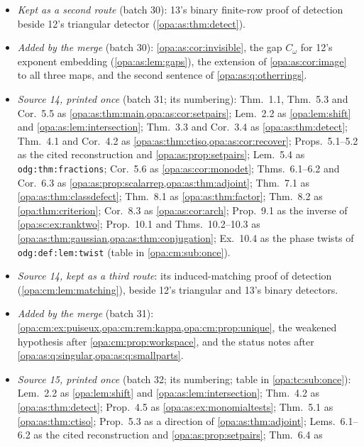 \documentclass[11pt,oneside]{article}
\numberwithin{equation}{section}
\theoremstyle{definition}
\theoremstyle{remark}
\newcommand{\lbl}[1]{\nolinkurl{#1}}
\begin{document}
\begin{itemize}[itemsep=2pt]
\lbl{saut:thm:coeffflow}; its constants and automorphism rigidity (11 prop.~8.1, cor.~8.2) are
\lbl{odg:def:thm:multiplier}, \lbl{odg:def:cor:internal} and \cref{opa:cor:allautos}.
\item \emph{Kept as a second route} (batch 30): 13's binary finite-row proof of detection beside
12's triangular detector (\cref{opa:as:thm:detect}).
\item \emph{Added by the merge} (batch 30): \cref{opa:as:cor:invisible}, the gap $C_\omega$ for
12's exponent embedding (\cref{opa:as:lem:gaps}), the extension of \cref{opa:as:cor:image} to all
three maps, and the second sentence of \cref{opa:as:q:otherrings}.
\item \emph{Source 14, printed once} (batch 31; its numbering): Thm.~1.1, Thm.~5.3 and Cor.~5.5 as
\cref{opa:as:thm:main,opa:as:cor:setpairs}; Lem.~2.2 as \cref{opa:lem:shift} and
\cref{opa:as:lem:intersection}; Thm.~3.3 and Cor.~3.4 as \cref{opa:as:thm:detect}; Thm.~4.1 and
Cor.~4.2 as \cref{opa:as:thm:ctiso,opa:as:cor:recover}; Props.~5.1--5.2 as the cited
reconstruction and \cref{opa:as:prop:setpairs}; Lem.~5.4 as \lbl{odg:thm:fractions}; Cor.~5.6 as
\cref{opa:as:cor:monodet}; Thms.~6.1--6.2 and Cor.~6.3 as
\cref{opa:as:prop:scalarrep,opa:as:thm:adjoint}; Thm.~7.1 as \cref{opa:as:thm:classdefect};
Thm.~8.1 as \cref{opa:as:thm:factor}; Thm.~8.2 as \cref{opa:thm:criterion}; Cor.~8.3 as
\cref{opa:as:cor:arch}; Prop.~9.1 as the inverse of \cref{opa:sc:ex:ranktwo}; Prop.~10.1 and
Thms.~10.2--10.3 as \cref{opa:as:thm:gaussian,opa:as:thm:conjugation}; Ex.~10.4 as the phase twists
of \lbl{odg:def:lem:twist} (table in \cref{opa:cm:sub:once}).
\item \emph{Source 14, kept as a third route}: its induced-matching proof of detection
(\cref{opa:cm:lem:matching}), beside 12's triangular and 13's binary detectors.
\item \emph{Added by the merge} (batch 31): \cref{opa:cm:ex:puiseux,opa:cm:rem:kappa,opa:cm:prop:unique},
the weakened hypothesis after \cref{opa:cm:prop:workspace}, and the status notes after
\cref{opa:as:q:singular,opa:as:q:smallparts}.
\item \emph{Source 15, printed once} (batch 32; its numbering; table in \cref{opa:tc:sub:once}): Lem.~2.2 as
\cref{opa:lem:shift} and \cref{opa:as:lem:intersection}; Thm.~4.2 as \cref{opa:as:thm:detect}; Prop.~4.5 as
\cref{opa:as:ex:monomialtests}; Thm.~5.1 as \cref{opa:as:thm:ctiso}; Prop.~5.3 as a direction of
\cref{opa:as:thm:adjoint}; Lems.~6.1--6.2 as the cited reconstruction and \cref{opa:as:prop:setpairs}; Thm.~6.4 as

\end{itemize}
\end{document}

